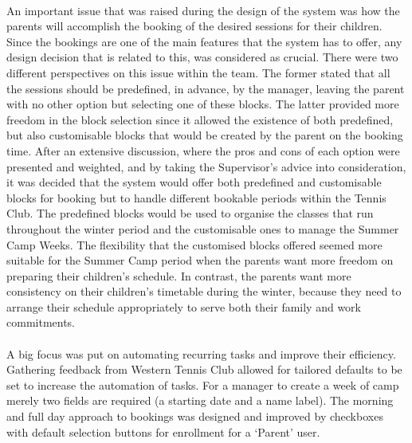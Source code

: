 \documentclass{l3proj}
\begin{document}
\\An important issue that was raised during the design of the system was how the parents will accomplish the booking of the desired sessions for their children. Since the bookings are one of the main features that the system has to offer, any design decision that is related to this, was considered as crucial. There were two different perspectives on this issue within the team. The former stated that all the sessions should be predefined, in advance, by the manager, leaving the parent with no other option but selecting one of these blocks. The latter provided more freedom in the block selection since it allowed the existence of both predefined, but also customisable blocks that would be created by the parent on the booking time. After an extensive discussion, where the pros and cons of each option were presented and weighted, and by taking the  Supervisor's advice into consideration, it was decided that the system would offer both predefined and customisable blocks for booking but to handle different bookable periods within the Tennis Club. The predefined blocks would be used to organise the classes that run throughout the winter period and the customisable ones to manage the Summer Camp Weeks. The flexibility that the customised blocks offered seemed more suitable for the Summer Camp period when the parents want more freedom on preparing their children's schedule. In contrast, the parents want more consistency on their children's timetable during the winter, because they need to arrange their schedule appropriately to serve both their family and work commitments.\\
\\A big focus was put on automating recurring tasks and improve their efficiency. Gathering feedback from Western Tennis Club allowed for tailored defaults to be set to increase the automation of tasks. For a manager to create a week of camp merely two fields are required (a starting date and a name label). The morning and full day approach to bookings was designed and improved by checkboxes with default selection buttons for enrollment for a `Parent' user.\\


\end{document}

